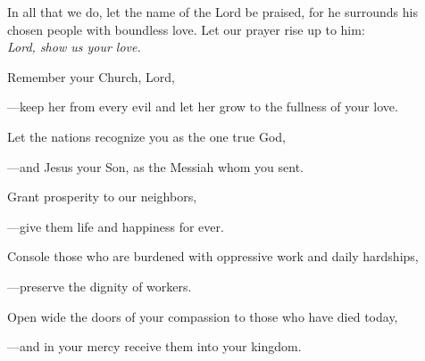 \intercessions\indent

\begin{hangpar}

In all that we do, let the name of the Lord be praised, for he surrounds his chosen people with boundless love. Let our prayer rise up to him:\\
\emph{Lord, show us your love.}

\medskip Remember your Church, Lord,

{\color{red}---\thinspace}keep her from every evil and let her grow to the fullness of your love.

\medskip Let the nations recognize you as the one true God,

{\color{red}---\thinspace}and Jesus your Son, as the Messiah whom you sent.

\medskip Grant prosperity to our neighbors,

{\color{red}---\thinspace}give them life and happiness for ever.

\medskip Console those who are burdened with oppressive work and daily hardships,

{\color{red}---\thinspace}preserve the dignity of workers.

\medskip Open wide the doors of your compassion to those who have died today,

{\color{red}---\thinspace}and in your mercy receive them into your kingdom.

\end{hangpar}


